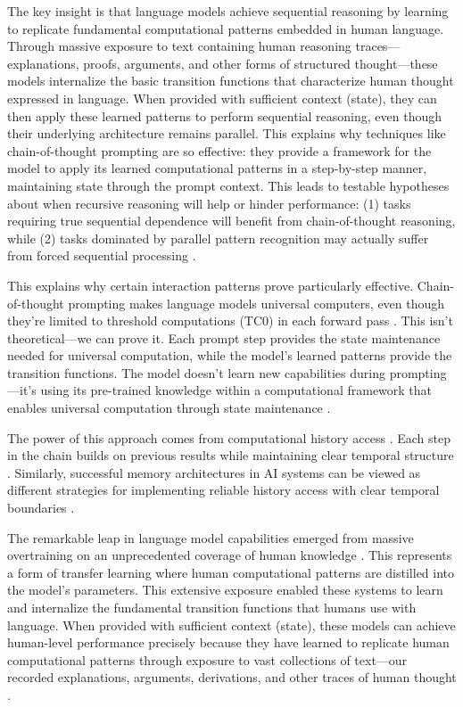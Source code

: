 \documentclass[12pt]{article}
\begin{document}
The key insight is that language models achieve sequential reasoning by learning to replicate fundamental computational patterns embedded in human language.
Through massive exposure to text containing human reasoning traces---explanations, proofs, arguments, and other forms of structured thought---these models internalize the basic transition functions that characterize human thought expressed in language.
When provided with sufficient context (state), they can then apply these learned patterns to perform sequential reasoning, even though their underlying architecture remains parallel.
This explains why techniques like chain-of-thought prompting are so effective: they provide a framework for the model to apply its learned computational patterns in a step-by-step manner, maintaining state through the prompt context.
This leads to testable hypotheses about when recursive reasoning will help or hinder performance: (1) tasks requiring true sequential dependence will benefit from chain-of-thought reasoning, while (2) tasks dominated by parallel pattern recognition may actually suffer from forced sequential processing \cite{liu2024mind}.

This explains why certain interaction patterns prove particularly effective.
Chain-of-thought prompting makes language models universal computers, even though they're limited to threshold computations (TC0) in each forward pass \cite{wei2022chain}.
This isn't theoretical---we can prove it.
Each prompt step provides the state maintenance needed for universal computation, while the model's learned patterns provide the transition functions.
The model doesn't learn new capabilities during prompting---it's using its pre-trained knowledge within a computational framework that enables universal computation through state maintenance \cite{ahn2024recursive}.

The power of this approach comes from computational history access \cite{fu2024memory}.
Each step in the chain builds on previous results while maintaining clear temporal structure \cite{wei2022chain}.
Similarly, successful memory architectures in AI systems can be viewed as different strategies for implementing reliable history access with clear temporal boundaries \cite{yang2013survey}.

The remarkable leap in language model capabilities emerged from massive overtraining on an unprecedented coverage of human knowledge \cite{schuurmans2024autoregressive}.
This represents a form of transfer learning where human computational patterns are distilled into the model's parameters.
This extensive exposure enabled these systems to learn and internalize the fundamental transition functions that humans use with language.
When provided with sufficient context (state), these models can achieve human-level performance precisely because they have learned to replicate human computational patterns through exposure to vast collections of text---our recorded explanations, arguments, derivations, and other traces of human thought \cite{brown2020language,wei2022chain}.
\end{document}
